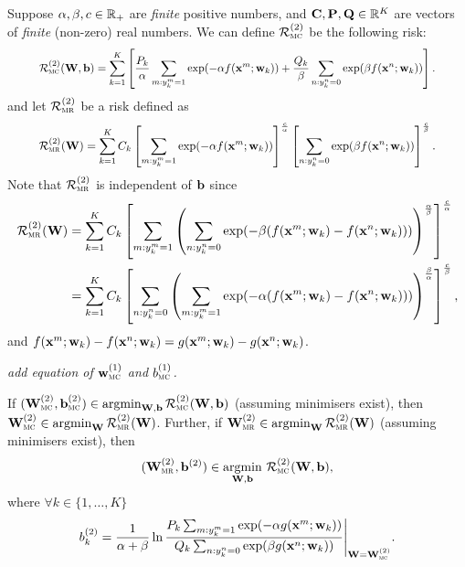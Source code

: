 Suppose $\alpha, \beta, c \in \mathbb{R}_+$ are \emph{finite} positive numbers, 
and $\mathbf{C}, \mathbf{P}, \mathbf{Q} \in \mathbb{R}^K$ are vectors of \emph{finite} (non-zero) real numbers.
We can define $\mathcal{R}_\textsc{mc}^{({2})}$ be the following risk:
\begin{equation}
\label{eq:mc2}
\resizebox{.9\linewidth}{!}{$
\displaystyle
\RCal_\textsc{mc}\pb{2}(\W, \bb) 
= \sum_{k=1}^K \left[ 
  \frac{P_k}{\alpha} \sum_{m: y_k^m = 1} \exp(-\alpha f(\x^m; \w_k)) +
  \frac{Q_k}{\beta } \sum_{n: y_k^n = 0} \exp( \beta  f(\x^n; \w_k)) \right].
$}
\end{equation}
and let $\mathcal{R}_\textsc{mr}^{({2})}$ be a risk defined as
\begin{equation}
\label{eq:mr2}
\resizebox{.9\linewidth}{!}{$
\displaystyle
\RCal_\textsc{mr}\pb{2}(\W) 
= \sum_{k=1}^K C_k
  \left[ \sum_{m: y_k^m = 1} \exp(-\alpha f(\x^m; \w_k)) \right]^\frac{c}{\alpha} 
  \left[ \sum_{n: y_k^n = 0} \exp( \beta  f(\x^n; \w_k)) \right]^\frac{c}{\beta}.
$}
\end{equation}
Note that $\mathcal{R}_\textsc{mr}^{({2})}$ is independent of $\mathbf{b}$ since 
\begin{equation*}
\resizebox{\linewidth}{!}{$
\displaystyle
\begin{aligned}
\RCal_\textsc{mr}\pb{2}(\W)
&= \sum_{k=1}^K C_k
   \left[ \sum_{m: y_k^m = 1} \left( \sum_{n: y_k^n = 0} 
   \exp(-\beta(f(\x^m; \w_k) - f(\x^n; \w_k))) \right)^\frac{\alpha}{\beta} \right]^\frac{c}{\alpha} \\
&= \sum_{k=1}^K C_k
   \left[ \sum_{n: y_k^n = 0} \left( \sum_{m: y_k^m = 1}
   \exp(-\alpha(f(\x^m; \w_k) - f(\x^n; \w_k))) \right)^\frac{\beta}{\alpha} \right]^\frac{c}{\beta},
\end{aligned}
$}
\end{equation*}
and $f(\mathbf{x}^m; \mathbf{w}_k) - f(\mathbf{x}^n; \mathbf{w}_k) = g(\mathbf{x}^m; \mathbf{w}_k) - g(\mathbf{x}^n; \mathbf{w}_k)$.


\TODO
{\it add equation of $\mathbf{w}_\textsc{mc}^{({1})}$ and $b_\textsc{mc}^{({1})}$.}

\begin{theorem}
\label{theorem:mc2=mr2}
If $(\mathbf{W}_\textsc{mc}^{({2})}, \mathbf{b}_\textsc{mc}^{({2})}) \in \operatorname*{argmin}_{\mathbf{W},\mathbf{b}} \mathcal{R}_\textsc{mc}^{({2})}(\mathbf{W}, \mathbf{b})$ (assuming minimisers exist),
then $\mathbf{W}_\textsc{mc}^{({2})} \in \operatorname*{argmin}_{\mathbf{W}} \mathcal{R}_\textsc{mr}^{({2})}(\mathbf{W})$.
Further, if $\mathbf{W}_\textsc{mr}^{({2})} \in \operatorname*{argmin}_{\mathbf{W}} \mathcal{R}_\textsc{mr}^{({2})}(\mathbf{W})$ (assuming minimisers exist),
then 
$$
(\mathbf{W}_\textsc{mr}^{({2})}, \mathbf{b}^{({2})}) \in \operatorname*{argmin}_{\mathbf{W},\mathbf{b}} \, \mathcal{R}_\textsc{mc}^{({2})}(\mathbf{W}, \mathbf{b}),
$$ 
where $\forall k \in \{1,\dots,K\}$
$$
b_k^{({2})}
= \frac{1}{\alpha + \beta}
  \ln \frac{P_k \sum_{m: y_k^m = 1} \exp(-\alpha g(\mathbf{x}^m; \mathbf{w}_k))} {Q_k \sum_{n: y_k^n = 0} \exp( \beta g(\mathbf{x}^n; \mathbf{w}_k))}
  \Bigg|_{\mathbf{W} = \mathbf{W}_\textsc{mc}^{({2})}}.
$$
\end{theorem}



